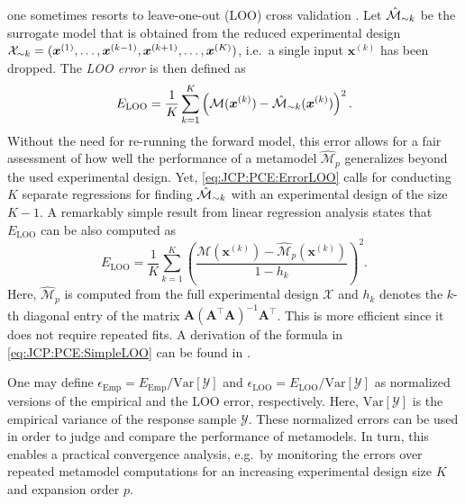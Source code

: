 one sometimes resorts to leave-one-out (LOO) cross validation \cite{Statistics:Arlot2010}.
Let \(\hat{\mathcal{M}}_{\sim k}\) be the surrogate model that is obtained from the reduced experimental design
\(\mathcal{X}_{\sim k} = (\bm{x}^{(1)},\ldots,\bm{x}^{(k-1)},\bm{x}^{(k+1)},\ldots,\bm{x}^{(K)})\), i.e.\ a single input \(\bm{x}^{(k)}\) has been dropped.
The \emph{LOO error} is then defined as
\begin{equation} \label{eq:JCP:PCE:ErrorLOO}
  E_{\mathrm{LOO}} = \frac{1}{K} \sum_{k=1}^K \left( \mathcal{M}(\bm{x}^{(k)})-\hat{\mathcal{M}}_{\sim k}(\bm{x}^{(k)}) \right)^2.
\end{equation}
Without the need for re-running the forward model, this error allows for a fair assessment of how well
the performance of a metamodel \(\hat{\mathcal{M}}_p\) generalizes beyond the used experimental design.
Yet, \cref{eq:JCP:PCE:ErrorLOO} calls for conducting \(K\) separate regressions for finding \(\hat{\mathcal{M}}_{\sim k}\) with an experimental design of the size \(K-1\).
A remarkably simple result from linear regression analysis states that \(E_{\mathrm{LOO}}\) can be also computed as
\begin{equation} \label{eq:JCP:PCE:SimpleLOO}
  E_{\mathrm{LOO}} = \frac{1}{K} \sum\limits_{k = 1}^K \left( \frac{\mathcal{M}(\bm{x}^{(k)}) - \hat{\mathcal{M}}_p(\bm{x}^{(k)})}{1 - h_k} \right)^2.
\end{equation}
Here, \(\hat{\mathcal{M}}_p\) is computed from the full experimental design \(\mathcal{X}\) and
\(h_k\) denotes the \(k\)-th diagonal entry of the matrix \(\bm{A} (\bm{A}^\top \bm{A})^{-1} \bm{A}^\top\).
This is more efficient since it does not require repeated fits.
A derivation of the formula in \cref{eq:JCP:PCE:SimpleLOO} can be found in \cite{Statistics:Seber2003}.
\par %
One may define \(\epsilon_{\mathrm{Emp}} = E_{\mathrm{Emp}} / \mathrm{Var}[\mathcal{Y}]\) and \(\epsilon_{\mathrm{LOO}} = E_{\mathrm{LOO}} / \mathrm{Var}[\mathcal{Y}]\)
as normalized versions of the empirical and the LOO error, respectively.
Here, \(\mathrm{Var}[\mathcal{Y}]\) is the empirical variance of the response sample \(\mathcal{Y}\).
These normalized errors can be used in order to judge and compare the performance of metamodels.
In turn, this enables a practical convergence analysis,
e.g.\ by monitoring the errors over repeated metamodel computations for an increasing experimental design size \(K\) and expansion order \(p\).